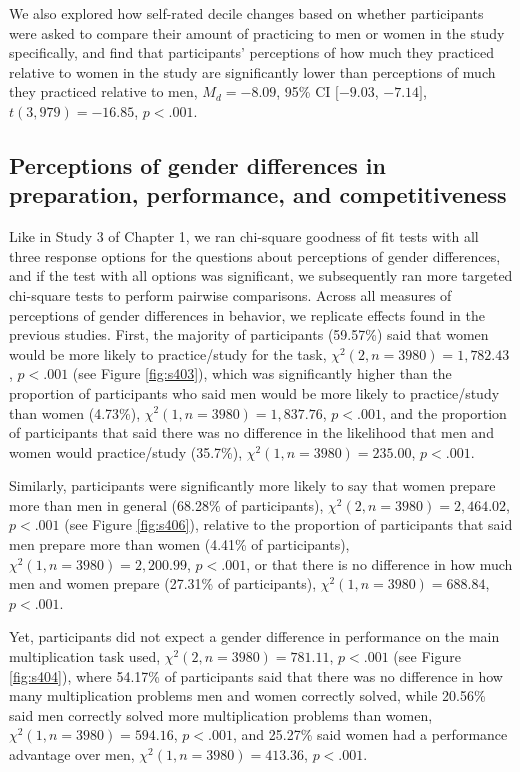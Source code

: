 \documentclass[a4paper, nobind]{templates/ociamthesis}
\begin{document}
We also explored how self-rated decile changes based on whether participants were asked to compare their amount of practicing to men or women in the study specifically, and find that participants' perceptions of how much they practiced relative to women in the study are significantly lower than perceptions of much they practiced relative to men, \(M_d = -8.09\), 95\% CI \([-9.03\), \(-7.14]\), \(t(3,979) = -16.85\), \(p < .001\).

\hypertarget{perceptions-of-gender-differences-in-preparation-performance-and-competitiveness-5}{%
\subsection{Perceptions of gender differences in preparation, performance, and competitiveness}\label{perceptions-of-gender-differences-in-preparation-performance-and-competitiveness-5}}

Like in Study 3 of Chapter 1, we ran chi-square goodness of fit tests with all three response options for the questions about perceptions of gender differences, and if the test with all options was significant, we subsequently ran more targeted chi-square tests to perform pairwise comparisons. Across all measures of perceptions of gender differences in behavior, we replicate effects found in the previous studies. First, the majority of participants (59.57\%) said that women would be more likely to practice/study for the task, \(\chi^2(2, n = 3980) = 1,782.43\), \(p < .001\) (see Figure \ref{fig:s403}), which was significantly higher than the proportion of participants who said men would be more likely to practice/study than women (4.73\%), \(\chi^2(1, n = 3980) = 1,837.76\), \(p < .001\), and the proportion of participants that said there was no difference in the likelihood that men and women would practice/study (35.7\%), \(\chi^2(1, n = 3980) = 235.00\), \(p < .001\).

Similarly, participants were significantly more likely to say that women prepare more than men in general (68.28\% of participants), \(\chi^2(2, n = 3980) = 2,464.02\), \(p < .001\) (see Figure \ref{fig:s406}), relative to the proportion of participants that said men prepare more than women (4.41\% of participants), \(\chi^2(1, n = 3980) = 2,200.99\), \(p < .001\), or that there is no difference in how much men and women prepare (27.31\% of participants), \(\chi^2(1, n = 3980) = 688.84\), \(p < .001\).

Yet, participants did not expect a gender difference in performance on the main multiplication task used, \(\chi^2(2, n = 3980) = 781.11\), \(p < .001\) (see Figure \ref{fig:s404}), where 54.17\% of participants said that there was no difference in how many multiplication problems men and women correctly solved, while 20.56\% said men correctly solved more multiplication problems than women, \(\chi^2(1, n = 3980) = 594.16\), \(p < .001\), and 25.27\% said women had a performance advantage over men, \(\chi^2(1, n = 3980) = 413.36\), \(p < .001\).
\end{document}
